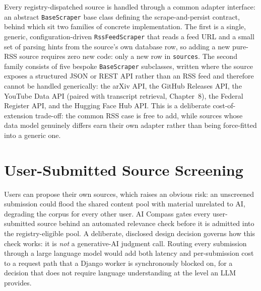 Every registry-dispatched source is handled through a common adapter interface: an abstract \texttt{BaseScraper} base class defining the scrape-and-persist contract, behind which sit two families of concrete implementation. The first is a single, generic, configuration-driven \texttt{RssFeedScraper} that reads a feed URL and a small set of parsing hints from the source's own database row, so adding a new pure-RSS source requires zero new code: only a new row in \texttt{sources}. The second family consists of five bespoke \texttt{BaseScraper} subclasses, written where the source exposes a structured JSON or REST API rather than an RSS feed and therefore cannot be handled generically: the arXiv API, the GitHub Releases API, the YouTube Data API (paired with transcript retrieval, Chapter~8), the Federal Register API, and the Hugging Face Hub API. This is a deliberate cost-of-extension trade-off: the common RSS case is free to add, while sources whose data model genuinely differs earn their own adapter rather than being force-fitted into a generic one.

\section{User-Submitted Source Screening}
\label{sec:relevance-gate}

Users can propose their own sources, which raises an obvious risk: an unscreened submission could flood the shared content pool with material unrelated to AI, degrading the corpus for every other user. AI Compass gates every user-submitted source behind an automated relevance check before it is admitted into the registry-eligible pool. A deliberate, disclosed design decision governs how this check works: it is \emph{not} a generative-AI judgment call. Routing every submission through a large language model would add both latency and per-submission cost to a request path that a Django worker is synchronously blocked on, for a decision that does not require language understanding at the level an LLM provides.

